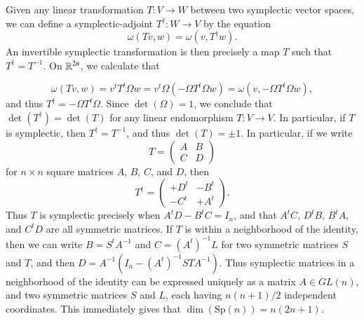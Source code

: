 Given any linear transformation $T: V \to W$ between two symplectic vector spaces, we can define a symplectic-adjoint $T^\dag: W \to V$ by the equation
%
\[ \omega(Tv,w) = \omega(v, T^\dag w). \]
%
An invertible symplectic transformation is then precisely a map $T$ such that $T^\dag = T^{-1}$. On $\operatorname{\mathbb{R}}^{2n}$, we calculate that

\[ \omega(Tv, w) = v^t T^t \Omega w = v^t \Omega (- \Omega T^t \Omega w) = \omega(v, - \Omega T^t \Omega w), \]
%
and thus $T^\dag = - \Omega T^t \Omega$. Since $\det(\Omega) = 1$, we conclude that $\det(T^\dag) = \det(T)$ for any linear endomorphism $T: V \to V$. In particular, if $T$ is symplectic, then $T^\dag = T^{-1}$, and thus $\det(T) = \pm 1$. In particular, if we write
%
\[ T = \begin{pmatrix} A & B \\ C & D \end{pmatrix} \]
%
for $n \times n$ square matrices $A$, $B$, $C$, and $D$, then
%
\[ T^\dag = \begin{pmatrix} +D^t & -B^t \\ - C^t & + A^t \end{pmatrix}. \]
%
Thus $T$ is symplectic precisely when $A^t D - B^t C = I_n$, and that $A^tC$, $D^t B$, $B^t A$, and $C^t D$ are all symmetric matrices. If $T$ is within a neighborhood of the identity, then we can write $B = S^t A^{-1}$ and $C = (A^t)^{-1} L$ for two symmetric matrices $S$ and $T$, and then $D = A^{-1}(I_n - (A^t)^{-1} ST A^{-1})$. Thus symplectic matrices in a neighborhood of the identity can be expressed uniquely as a matrix $A \in GL(n)$, and two symmetric matrices $S$ and $L$, each having $n(n+1)/2$ independent coordinates. This immediately gives that $\dim(\text{Sp}(n)) = n(2n+1)$.

